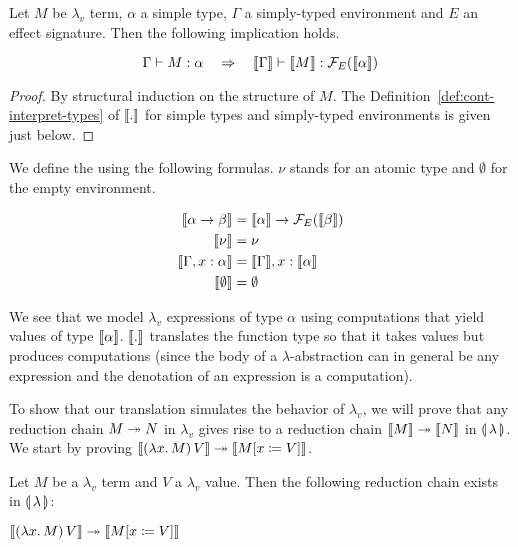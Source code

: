 \begin{property}
  Let $M$ be $\lambda_v$ term, $\alpha$ a simple type, $\Gamma$ a
  simply-typed environment and $E$ an effect signature. Then the following
  implication holds.

$$
\Gamma \vdash M : \alpha
\quad \Rightarrow \quad
\llbracket \Gamma \rrbracket \vdash \llbracket M \rrbracket : \mathcal{F}_E(\llbracket \alpha \rrbracket)
$$
\end{property}

\begin{proof}
  By structural induction on the structure of $M$. The
  Definition~\ref{def:cont-interpret-types} of $\llbracket . \rrbracket$ for simple types
  and simply-typed environments is given just below.
\end{proof}

\begin{definition}\label{def:cont-interpret-types}
We define the  using the
following formulas. $\nu$ stands for an atomic type and $\emptyset$ for the
empty environment.

\begin{align*}
  \llbracket \alpha \to \beta \rrbracket &= \llbracket \alpha \rrbracket \to \mathcal{F}_E(\llbracket \beta \rrbracket) \\
  \llbracket \nu \rrbracket &= \nu \\
  \llbracket \Gamma, x: \alpha \rrbracket &= \llbracket \Gamma \rrbracket, x: \llbracket \alpha \rrbracket \\
  \llbracket \emptyset \rrbracket &= \emptyset
\end{align*}
\end{definition}

We see that we model $\lambda_v$ expressions of type $\alpha$ using
computations that yield values of type $\llbracket \alpha \rrbracket$. $\llbracket . \rrbracket$ translates
the function type so that it takes values but produces computations (since
the body of a $\lambda$-abstraction can in general be any expression and
the denotation of an expression is a computation).

To show that our translation simulates the behavior of $\lambda_v$, we will
prove that any reduction chain $M \twoheadrightarrow N$ in $\lambda_v$ gives rise to a
reduction chain $\llbracket M \rrbracket \twoheadrightarrow \llbracket N \rrbracket$ in $\llparenthesis \, \lambda \, \rrparenthesis$. We start by
proving $\llbracket (\lambda x.\, M)\,V \rrbracket \twoheadrightarrow \llbracket M[x \coloneqq V] \rrbracket$.

\begin{property}
  Let $M$ be a $\lambda_v$ term and $V$ a $\lambda_v$ value. Then the
  following reduction chain exists in ${\llparenthesis \, \lambda \, \rrparenthesis}$:
  
  $\llbracket (\lambda x.\, M)\,V \rrbracket \twoheadrightarrow \llbracket M[x \coloneqq V] \rrbracket$
\end{property}

